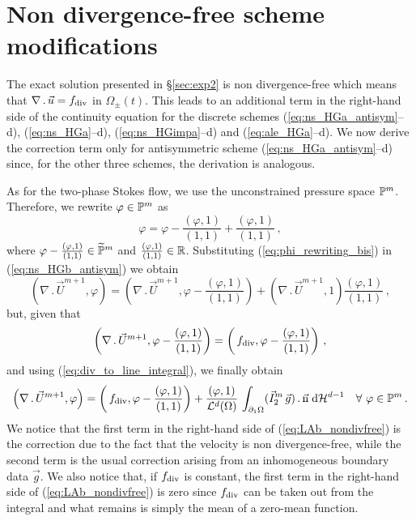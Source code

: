 \section{Non divergence-free scheme modifications}\label{sec:ns_non_div_free}
The exact solution presented in \S\ref{sec:exp2} is non
divergence-free which means that $\nabla\,.\,\vec u = f_{\rm{div}}$ in
$\Omega_\pm(t)$. This leads to an additional term in the right-hand side of the
continuity equation for the discrete schemes (\ref{eq:ns_HGa_antisym}--d),
(\ref{eq:ns_HGa}--d), (\ref{eq:ns_HGimpa}--d) and (\ref{eq:ale_HGa}--d). We
now derive the correction term only for antisymmetric scheme
(\ref{eq:ns_HGa_antisym}--d) since, for the other three schemes, the
derivation is analogous.

As for the two-phase Stokes flow, we use the unconstrained pressure space
$\mathbb{P}^m$. Therefore, we rewrite $\varphi\in \mathbb{P}^m$ as
\begin{equation}\label{eq:phi_rewriting_bis}
\varphi=\varphi-\frac{\left(\varphi,1\right)}{\left(1,1\right)}
+\frac{\left(\varphi,1\right)}{\left(1,1\right)}\,,
\end{equation}
where $\varphi-\frac{(\varphi,1)}{(1,1)}\in\widetilde{\mathbb{P}}^m$ and
$\frac{(\varphi,1)}{(1,1)}\in\mathbb R$. Substituting (\ref{eq:phi_rewriting_bis}) in
(\ref{eq:ns_HGb_antisym}) we obtain
\begin{equation}
\left(\nabla\,.\,\vec U^{m+1}, \varphi\right)  =
\left(\nabla\,.\,\vec U^{m+1},
\varphi-\frac{\left(\varphi,1\right)}{\left(1,1\right)}\right) +
\left(\nabla\,.\,\vec U^{m+1},1\right)
\frac{\left(\varphi,1\right)}{\left(1,1\right)}\,,
\end{equation}
but, given that
\begin{equation}
\left(\nabla\,.\,\vec U^{m+1},
\varphi-\frac{\left(\varphi,1\right)}{\left(1,1\right)}\right) =
\left(\,f_{\rm{div}},
\varphi-\frac{\left(\varphi,1\right)}{\left(1,1\right)}\right)\,,
\end{equation}
and using (\ref{eq:div_to_line_integral}), we finally obtain
\begin{equation}\label{eq:LAb_nondivfree}
\left(\nabla\,.\,\vec U^{m+1}, \varphi\right) =
\left(\,f_{\rm{div}},
\varphi-\frac{\left(\varphi,1\right)}{\left(1,1\right)}\right)+
\frac{\left(\varphi, 1\right)}{\mathcal{L}^d(\Omega)}\, \int_{\partial_1\Omega}
(\vec I^m_2\,\vec g) \,.\, \vec{\rm n} \;{\rm d}{\cal H}^{d-1} \quad \forall\ \varphi \in
\mathbb{P}^m\,.
\end{equation}
We notice that the first term in the right-hand side of
(\ref{eq:LAb_nondivfree}) is the correction due to the fact that the velocity is
non divergence-free, while the second term is the usual correction arising
from an inhomogeneous boundary data $\vec g$. We also notice that, if
$f_{\rm{div}}$ is constant, the first term in the right-hand side of
(\ref{eq:LAb_nondivfree}) is zero since $f_{\rm{div}}$ can be taken out
from the integral and what remains is simply the mean of a zero-mean function.

